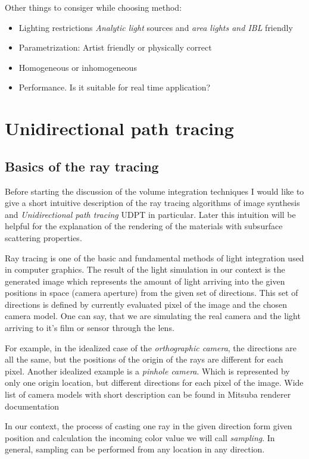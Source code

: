 Other things to consiger while choosing method:
\begin{itemize}
  \item Lighting restrictions \emph{Analytic light} sources and \emph{area lights and IBL} friendly
  \item Parametrization: Artist friendly or physically correct
  \item Homogeneous or inhomogeneous
  \item Performance. Is it suitable for real time application?
\end{itemize}

\section{Unidirectional path tracing}

\subsection{Basics of the ray tracing}
Before starting the discussion of the volume integration techniques I would like to give a short
intuitive description of the ray tracing algorithms of image synthesis and \emph{Unidirectional path
tracing} \gls{UDPT} in particular. Later this intuition will be helpful for the explanation of the
rendering of the materials with subsurface scattering properties.

Ray tracing is one of the basic and fundamental methods of light integration used in computer
graphics. The result of the light simulation in our context is the generated image which represents
the amount of light arriving into the given positions in space (camera aperture) from the given set
of directions. This set of directions is defined by currently evaluated pixel of the image and the
chosen camera model. One can say, that we are simulating the real camera and the light arriving to
it's film or sensor through the lens. 

For example, in the idealized case of the \emph{orthographic camera}, the directions are all the
same, but the positions of the origin of the rays are different for each pixel. Another idealized
example is a \emph{pinhole camera}.
Which is represented by only one origin location, but different directions for each pixel of the
image. Wide list of camera models with short description can be found in Mitsuba renderer
documentation \cite{Mitsuba}

In our context, the process of casting one ray in the given direction form given position and
calculation the incoming color value we will call \emph{sampling}. In general, sampling can be
performed from any location in any direction.

